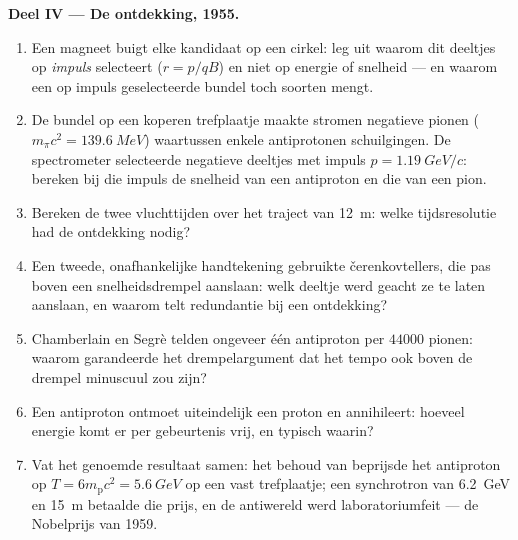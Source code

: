 \begin{problem}
\medskip\noindent\textbf{Deel IV --- De ontdekking, 1955.}
\begin{enumerate}[resume]
  \item Een magneet buigt elke kandidaat op een cirkel: leg uit waarom
        dit deeltjes op \emph{impuls} selecteert ($r = p/qB$) en niet op
        energie of snelheid --- en waarom een op impuls geselecteerde
        bundel toch soorten mengt.
  \item De bundel op een koperen trefplaatje maakte stromen negatieve
        pionen ($m_\pi c^2 = \qty{139.6}{MeV}$) waartussen enkele
        antiprotonen schuilgingen. De spectrometer selecteerde negatieve
        deeltjes met impuls $p = \qty{1.19}{GeV}/c$: bereken bij die
        impuls de snelheid van een antiproton en die van een pion.
  \item Bereken de twee vluchttijden over het traject van \qty{12}{m}:
        welke tijdsresolutie had de ontdekking nodig?
  \item Een tweede, onafhankelijke handtekening gebruikte
        \v cerenkovtellers, die pas boven een snelheidsdrempel
        aanslaan: welk deeltje werd geacht ze te laten aanslaan, en
        waarom telt redundantie bij een ontdekking?
  \item Chamberlain en Segrè telden ongeveer één antiproton per
        $\num{44000}$ pionen: waarom garandeerde het drempelargument dat
        het tempo ook boven de drempel minuscuul zou zijn?
  \item Een antiproton ontmoet uiteindelijk een proton en annihileert:
        hoeveel energie komt er per gebeurtenis vrij, en typisch waarin?
  \item Vat het genoemde resultaat samen: het behoud van 
        beprijsde het antiproton op $T = 6m_{\text{p}}c^2 =
        \qty{5.6}{GeV}$ op een vast trefplaatje; een synchrotron van
        \qty{6.2}{GeV} en \qty{15}{m} betaalde die prijs, en de
        antiwereld werd laboratoriumfeit --- de Nobelprijs van 1959.
\end{enumerate}
\end{problem}
